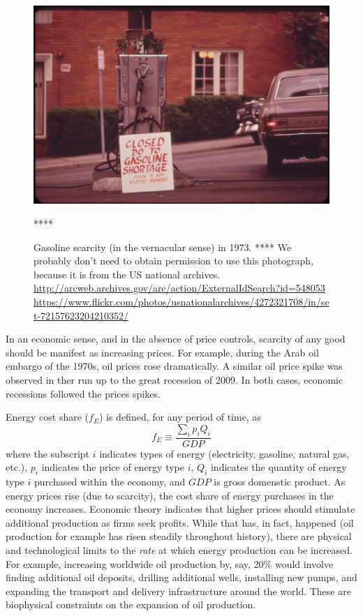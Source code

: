 \begin{figure}[!ht]
\centering\
\includegraphics[width=\linewidth]{Part_0/Chapter_Introduction/images/gas_shortage_1973.jpg}
\caption[Gasoline shortage]{Gasoline scarcity (in the vernacular sense) in 1973.
**** We probably don't need to obtain permission to use this photograph, because
it is from the US national archives.
\url{http://arcweb.archives.gov/arc/action/ExternalIdSearch?id=548053}
\url{https://www.flickr.com/photos/usnationalarchives/4272321708/in/set-72157623204210352/}}
****
\label{fig:gas_shortage}
\end{figure}

In an economic sense, and in the absence of price controls, 
scarcity of any good should be manifest as increasing prices.
For example, during the Arab oil embargo of the 1970s, 
oil prices rose dramatically.
A similar oil price spike was observed in ther run up to the great recession
of 2009.
In both cases, economic recessions followed the prices spikes.

Energy cost share ($f_E$) is defined, for any period of time, as
%
\begin{equation}
	f_E \equiv \frac{\displaystyle\sum_i p_i Q_i}{GDP}
\end{equation}
%
where 
the subscript $i$ indicates types of energy 
(electricity, gasoline, natural gas, etc.),
$p_i$ indicates the price of energy type $i$,
$Q_i$ indicates the quantity of energy type $i$ purchased within the economy, and
$GDP$ is gross domenstic product.
As energy prices rise (due to scarcity), 
the cost share of energy purchases in the economy
increases.
Economic theory indicates that higher prices should stimulate additional production
as firms seek profits.
While that has, in fact, happened
(oil production for example has risen steadily throughout history), 
there are physical and technological limits 
to the \emph{rate} at which energy production can be increased.
For example, increasing worldwide oil production by, say, 20\% would involve
finding additional oil deposits, drilling additional wells, installing new pumps,
and expanding the transport and delivery infrastructure around the world.
These are biophysical constraints on the expansion of oil production.


